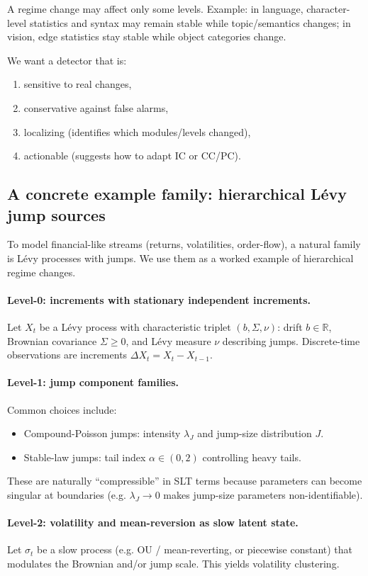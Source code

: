 \documentclass[11pt]{article}
\newcommand{\R}{\mathbb{R}}
\begin{document}
A regime change may affect only some levels.
Example: in language, character-level statistics and syntax may remain stable while topic/semantics changes;
in vision, edge statistics stay stable while object categories change.

We want a detector that is:
\begin{enumerate}
  \item sensitive to real changes,
  \item conservative against false alarms,
  \item localizing (identifies which modules/levels changed),
  \item actionable (suggests how to adapt IC or CC/PC).
\end{enumerate}

\subsection{A concrete example family: hierarchical L\'evy jump sources}\label{sec:levy}
To model financial-like streams (returns, volatilities, order-flow), a natural family is L\'evy processes with jumps.
We use them as a worked example of hierarchical regime changes.

\paragraph{Level-0: increments with stationary independent increments.}
Let $X_t$ be a L\'evy process with characteristic triplet $(b,\Sigma,\nu)$:
drift $b\in\R$, Brownian covariance $\Sigma \ge 0$, and L\'evy measure $\nu$ describing jumps.
Discrete-time observations are increments $\Delta X_t = X_t - X_{t-1}$.

\paragraph{Level-1: jump component families.}
Common choices include:
\begin{itemize}
  \item Compound-Poisson jumps: intensity $\lambda_J$ and jump-size distribution $J$.
  \item Stable-law jumps: tail index $\alpha \in (0,2)$ controlling heavy tails.
\end{itemize}
These are naturally ``compressible'' in SLT terms because parameters can become singular at boundaries
(e.g. $\lambda_J \to 0$ makes jump-size parameters non-identifiable).

\paragraph{Level-2: volatility and mean-reversion as slow latent state.}
Let $\sigma_t$ be a slow process (e.g. OU / mean-reverting, or piecewise constant) that modulates
the Brownian and/or jump scale. This yields volatility clustering.
\end{document}
